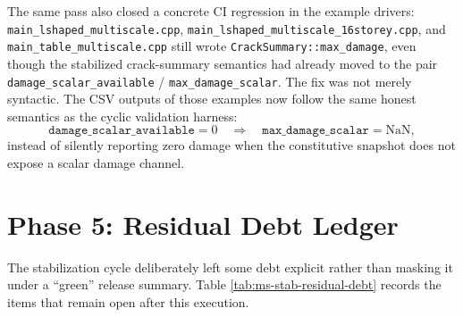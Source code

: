 The same pass also closed a concrete CI regression in the example drivers:
\texttt{main\_lshaped\_multiscale.cpp},
\texttt{main\_lshaped\_multiscale\_16storey.cpp}, and
\texttt{main\_table\_multiscale.cpp} still wrote
\texttt{CrackSummary::max\_damage}, even though the stabilized crack-summary
semantics had already moved to the pair
\texttt{damage\_scalar\_available} / \texttt{max\_damage\_scalar}.  The fix was
not merely syntactic.  The CSV outputs of those examples now follow the same
honest semantics as the cyclic validation harness:
\begin{equation}
  \texttt{damage\_scalar\_available} = 0
  \quad\Longrightarrow\quad
  \texttt{max\_damage\_scalar} = \mathrm{NaN},
  \label{eq:ms-stab-example-damage-csv-semantics}
\end{equation}
instead of silently reporting zero damage when the constitutive snapshot does
not expose a scalar damage channel.

\section{Phase 5: Residual Debt Ledger}
\label{sec:ms-stab-phase5}

The stabilization cycle deliberately left some debt explicit rather than
masking it under a ``green'' release summary.  Table
\ref{tab:ms-stab-residual-debt} records the items that remain open after this
execution.

